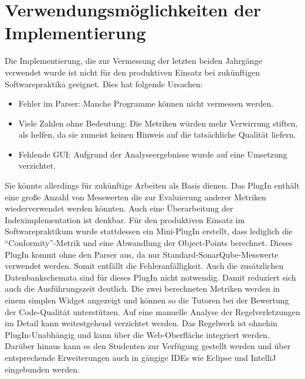 \documentclass[da,ngerman]{stthesis}
\begin{document}
		\section{Verwendungsmöglichkeiten der Implementierung}
			Die Implementierung, die zur Vermessung der letzten beiden Jahrgänge verwendet wurde ist nicht für den produktiven Einsatz bei zukünftigen Softwarepraktika geeignet. Dies hat folgende Ursachen:
			\begin{itemize}
				\item Fehler im Parser: Manche Programme können nicht vermessen werden.
				\item Viele Zahlen ohne Bedeutung: Die Metriken würden mehr Verwirrung stiften, als helfen, da sie zumeist keinen Hinweis auf die tatsächliche Qualität liefern.
				\item Fehlende GUI: Aufgrund der Analyseergebnisse wurde auf eine Umsetzung verzichtet.
			\end{itemize}
			Sie könnte allerdings für zukünftige Arbeiten als Basis dienen. Das PlugIn enthält eine große Anzahl von Messwerten die zur Evaluierung anderer Metriken wiederverwendet werden könnten. Auch eine Überarbeitung der Indeximplementation ist denkbar. \newline
			Für den produktiven Einsatz im Softwarepraktikum wurde stattdessen ein Mini-PlugIn erstellt, dass lediglich die "`Conformity"'-Metrik und eine Abwandlung der Object-Points berechnet. Dieses PlugIn kommt ohne den Parser aus, da nur Standard-SonarQube-Messwerte verwendet werden. Somit entfällt die Fehleranfälligkeit. Auch die zusätzlichen Datenbankschemata sind für dieses PlugIn nicht notwendig. Damit reduziert sich auch die Ausführungszeit deutlich. Die zwei berechneten Metriken werden in einem simplen Widget angezeigt und können so die Tutoren bei der Bewertung der Code-Qualität unterstützen. Auf eine manuelle Analyse der Regelverletzungen im Detail kann weitestgehend verzichtet werden. Das Regelwerk ist ohnehin PlugIn-Unabhängig und kann über die Web-Oberfläche integriert werden. Darüber hinaus kann es den Studenten zur Verfügung gestellt werden und über entsprechende Erweiterungen auch in gängige IDEs wie Eclipse und IntelliJ eingebunden werden.
\end{document}

